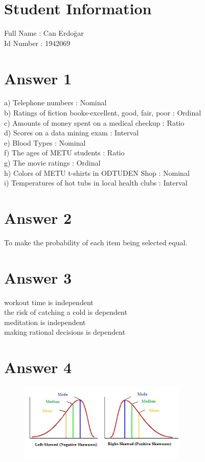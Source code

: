 \documentclass[12pt]{article}
\begin{document}
\section*{Student Information } 
Full Name :  Can Erdoğar \\
Id Number :  1942069 \\

\section*{Answer 1}
a) Telephone numbers : Nominal \\
b) Ratings of fiction books-excellent, good, fair, poor : Ordinal \\
c) Amounts of money spent on a medical checkup : Ratio \\
d) Scores on a data mining exam : Interval \\
e) Blood Types : Nominal \\
f) The ages of METU students : Ratio \\
g) The movie ratings : Ordinal \\
h) Colors of METU t-shirts in ODTUDEN Shop : Nominal\\
i) Temperatures of hot tubs in local health clubs : Interval \\

\section*{Answer 2}
To make the probability of each item being selected equal.\\

\section*{Answer 3}
workout time is independent \\
the risk of catching a cold is dependent \\
meditation is independent \\
making rational decisions is dependent \\
\section*{Answer 4}
\begin{figure}[H]
\includegraphics[width=8cm]{pearson-mode-skewness.jpg}
\centering
\end{figure}
\end{document}
